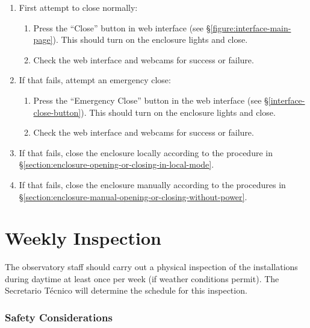 \begin{enumerate}
    \item
        First attempt to close normally:
        \begin{enumerate}
            \item
                Press the “Close” button in web interface (see \S\ref{figure:interface-main-page}). This should turn on the enclosure lights and close.
            \item
                Check the web interface and webcams for success or failure.
        \end{enumerate}
    \item
        If that fails, attempt an emergency close:
        \begin{enumerate}
            \item
                Press the “Emergency Close” button in the web interface (see \S\ref{interface-close-button}). This should turn on the enclosure lights and close.
            \item
                Check the web interface and webcams for success or failure.
        \end{enumerate}
    \item
        If that fails, close the enclosure locally according to the procedure in \S\ref{section:enclosure-opening-or-closing-in-local-mode}.
    \item
        If that fails, close the enclosure manually according to the procedures in
        \S\ref{section:enclosure-manual-opening-or-closing-without-power}.
\end{enumerate}

\section{Weekly Inspection}

The observatory staff should carry out a physical inspection of the installations during daytime at least once per week (if weather conditions permit). The Secretario Técnico will determine the schedule for this inspection.

\subsubsection{Safety Considerations}


